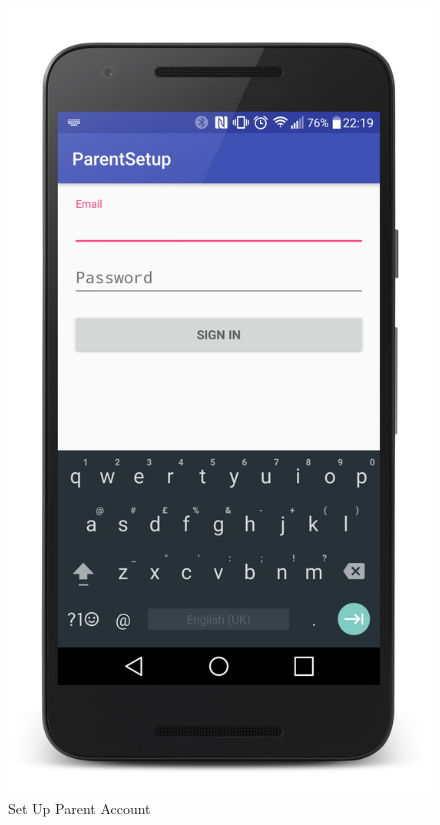 \begin{figure}[ht]
\begin{minipage}[b]{0.45\linewidth}
    \includegraphics[width=.8\linewidth]{../images/Screenshot/ParentSetup.jpg}
    \caption{Set Up Parent Account} 
    \vspace{4ex}
  \end{minipage}%
\end{figure}